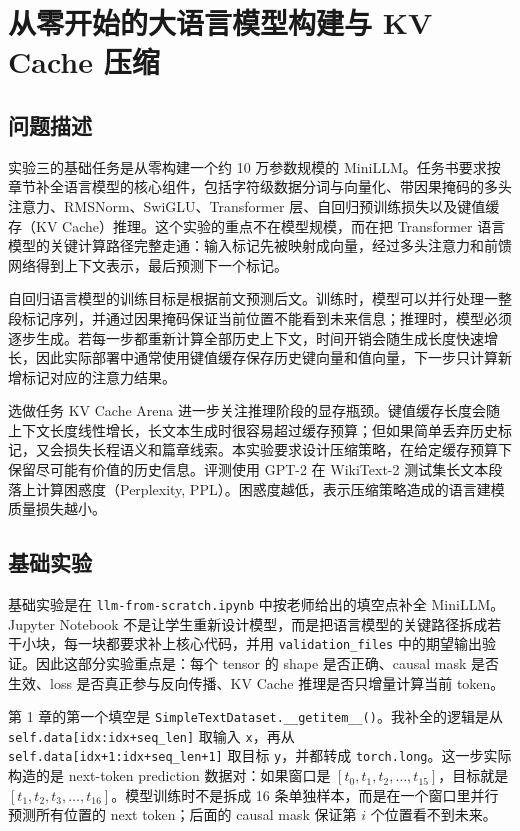 \documentclass[12pt,a4paper,UTF8]{ctexart}
\newcommand{\xiaosi}{\fontsize{12pt}{18pt}\selectfont}
\newcommand{\labsection}[1]{\clearpage\section{#1}}
\newenvironment{reportbody}{\songti\xiaosi\onehalfspacing\sloppy}{}
\begin{document}
\begin{reportbody}
\labsection{从零开始的大语言模型构建与 KV Cache 压缩}

\subsection{问题描述}
实验三的基础任务是从零构建一个约 10 万参数规模的 MiniLLM。任务书要求按章节补全语言模型的核心组件，包括字符级数据分词与向量化、带因果掩码的多头注意力、RMSNorm、SwiGLU、Transformer 层、自回归预训练损失以及键值缓存（KV Cache）推理。这个实验的重点不在模型规模，而在把 Transformer 语言模型的关键计算路径完整走通：输入标记先被映射成向量，经过多头注意力和前馈网络得到上下文表示，最后预测下一个标记。

自回归语言模型的训练目标是根据前文预测后文。训练时，模型可以并行处理一整段标记序列，并通过因果掩码保证当前位置不能看到未来信息；推理时，模型必须逐步生成。若每一步都重新计算全部历史上下文，时间开销会随生成长度快速增长，因此实际部署中通常使用键值缓存保存历史键向量和值向量，下一步只计算新增标记对应的注意力结果。

选做任务 KV Cache Arena 进一步关注推理阶段的显存瓶颈。键值缓存长度会随上下文长度线性增长，长文本生成时很容易超过缓存预算；但如果简单丢弃历史标记，又会损失长程语义和篇章线索。本实验要求设计压缩策略，在给定缓存预算下保留尽可能有价值的历史信息。评测使用 GPT-2 在 WikiText-2 测试集长文本段落上计算困惑度（Perplexity, PPL）。困惑度越低，表示压缩策略造成的语言建模质量损失越小。

\subsection{基础实验}
基础实验是在 \texttt{llm-from-scratch.ipynb} 中按老师给出的填空点补全 MiniLLM。Jupyter Notebook 不是让学生重新设计模型，而是把语言模型的关键路径拆成若干小块，每一块都要求补上核心代码，并用 \texttt{validation\_files} 中的期望输出验证。因此这部分实验重点是：每个 tensor 的 shape 是否正确、causal mask 是否生效、loss 是否真正参与反向传播、KV Cache 推理是否只增量计算当前 token。

第 1 章的第一个填空是 \texttt{SimpleTextDataset.\_\_getitem\_\_()}。我补全的逻辑是从 \texttt{self.data[idx:idx+seq\_len]} 取输入 \texttt{x}，再从 \texttt{self.data[idx+1:idx+seq\_len+1]} 取目标 \texttt{y}，并都转成 \texttt{torch.long}。这一步实际构造的是 next-token prediction 数据对：如果窗口是 \([t_0,t_1,t_2,\ldots,t_{15}]\)，目标就是 \([t_1,t_2,t_3,\ldots,t_{16}]\)。模型训练时不是拆成 16 条单独样本，而是在一个窗口里并行预测所有位置的 next token；后面的 causal mask 保证第 \(i\) 个位置看不到未来。


\end{reportbody}
\end{document}
